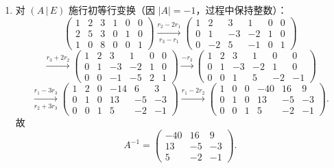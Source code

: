 \documentclass[12pt]{ctexart}
\begin{document}
\begin{enumerate}[label=\textbf{\arabic*.},itemsep=13pt]
\item 对 $(A\,|\,E)$ 施行初等行变换（因 $|A|=-1$，过程中保持整数）：
  \[
  \left(\begin{array}{ccc|ccc}
  1&2&3&1&0&0\\ 2&5&3&0&1&0\\ 1&0&8&0&0&1
  \end{array}\right)
  \xrightarrow[r_3-r_1]{r_2-2r_1}
  \left(\begin{array}{ccc|ccc}
  1&2&3&1&0&0\\ 0&1&-3&-2&1&0\\ 0&-2&5&-1&0&1
  \end{array}\right)
  \]
  \[
  \xrightarrow{r_3+2r_2}
  \left(\begin{array}{ccc|ccc}
  1&2&3&1&0&0\\ 0&1&-3&-2&1&0\\ 0&0&-1&-5&2&1
  \end{array}\right)
  \xrightarrow{-r_3}
  \left(\begin{array}{ccc|ccc}
  1&2&3&1&0&0\\ 0&1&-3&-2&1&0\\ 0&0&1&5&-2&-1
  \end{array}\right)
  \]
  \[
  \xrightarrow[r_2+3r_3]{r_1-3r_3}
  \left(\begin{array}{ccc|ccc}
  1&2&0&-14&6&3\\ 0&1&0&13&-5&-3\\ 0&0&1&5&-2&-1
  \end{array}\right)
  \xrightarrow{r_1-2r_2}
  \left(\begin{array}{ccc|ccc}
  1&0&0&-40&16&9\\ 0&1&0&13&-5&-3\\ 0&0&1&5&-2&-1
  \end{array}\right).
  \]
  故
  \[
  A^{-1}=\begin{pmatrix}-40&16&9\\ 13&-5&-3\\ 5&-2&-1\end{pmatrix}.
  \]


\end{enumerate}
\end{document}
